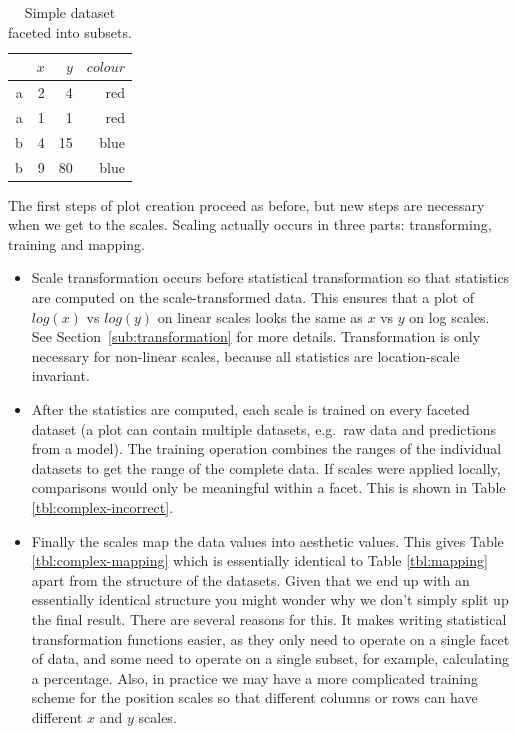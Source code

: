 \begin{table}[ht]
  \centering
  \begin{tabular}{r|r|r|r}
    & $x$ & $y$ & $colour$\\
    \hline
    a & 2 & 4 & red\\
    a & 1 & 1 & red\\
    \hline \hline
    b & 4 & 15 & blue\\
    b & 9 & 80 & blue
  \end{tabular}

  \caption{Simple dataset faceted into subsets.}
  \label{tbl:complex}
\end{table}

The first steps of plot creation proceed as before, but new steps are necessary when we get to the scales.   Scaling actually occurs in three parts: transforming, training and mapping. 

\begin{itemize}
  \item  Scale transformation occurs before statistical transformation so that statistics are computed on the scale-transformed data.  This ensures that a plot of $log(x)$ vs $log(y)$ on linear scales looks the same as $x$ vs $y$ on log scales.  See Section~\ref{sub:transformation} for more details. Transformation is only necessary for non-linear scales, because all statistics are location-scale invariant.

  \item After the statistics are computed, each scale is trained on every faceted dataset (a plot can contain multiple datasets, e.g.\ raw data and predictions from a model).  The training operation combines the ranges of the individual datasets to get the range of the complete data.  If scales were applied locally, comparisons would only be meaningful within a facet.  This is shown in Table \ref{tbl:complex-incorrect}.

  \item Finally the scales map the data values into aesthetic values.  This gives Table \ref{tbl:complex-mapping} which is essentially identical to Table \ref{tbl:mapping} apart from the structure of the datasets.  Given that we end up with an essentially identical structure you might wonder why we don't simply split up the final result.  There are several reasons for this.  It makes writing statistical transformation functions easier, as they only need to operate on a single facet of data, and some need to operate on a single subset, for example, calculating a percentage.  Also, in practice we may have a more complicated training scheme for the position scales so that different columns or rows can have different $x$ and $y$ scales.  
  
\end{itemize}

